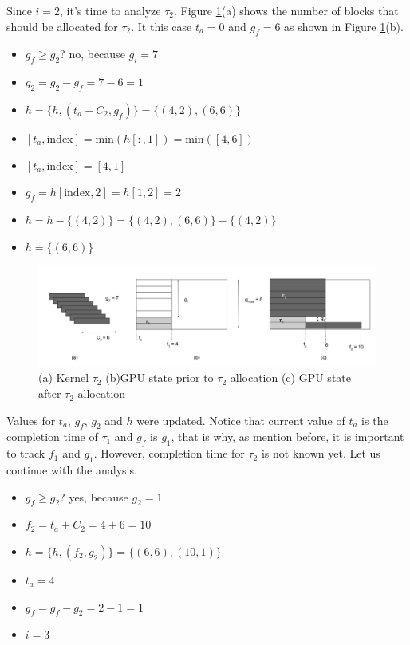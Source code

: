 \documentclass[
  12pt,
  a4paperpaper,
]{report}
\providecommand{\tightlist}{%
  \setlength{\itemsep}{0pt}\setlength{\parskip}{0pt}}
\begin{document}
Since \(i=2\), it's time to analyze \(\tau_2\). Figure \ref{img:ex_2}(a)
shows the number of blocks that should be allocated for \(\tau_2\). It
this case \(t_a = 0\) and \(g_f = 6\) as shown in Figure
\ref{img:ex_2}(b).

\begin{itemize}
\tightlist
\item
  \(g_f \geq g_2\)? no, because \(g_i = 7\)
\item
  \(g_2 = g_2 - g_f = 7-6 = 1\)
\item
  \(h = \{h, (t_a + C_2, g_f)\} = \{ (4,2), (6,6) \}\)
\item
  \([ t_a, \mathrm{index} ] = \mathrm{min}(h[:,1]) = \mathrm{min}([4,6])\)
\item
  \([ t_a, \mathrm{index} ] = [4,1]\)
\item
  \(g_f = h[ \mathrm{index},2] = h[1,2] = 2\)
\item
  \(h = h - \{ (4,2) \} = \{ (4,2), (6,6) \} - \{ (4,2) \}\)
\item
  \(h = \{(6,6)\}\)
\end{itemize}

\begin{figure}
\centering
\includegraphics{source/figures/ex_2.jpg}
\caption{(a) Kernel \(\tau_2\) (b)GPU state prior to \(\tau_2\)
allocation (c) GPU state after \(\tau_2\) allocation \label{img:ex_2}}
\end{figure}

Values for \(t_a\), \(g_f\), \(g_2\) and \(h\) were updated. Notice that
current value of \(t_a\) is the completion time of \(\tau_1\) and
\(g_f\) is \(g_1\), that is why, as mention before, it is important to
track \(f_1\) and \(g_1\). However, completion time for \(\tau_2\) is
not known yet. Let us continue with the analysis.

\begin{itemize}
\tightlist
\item
  \(g_f \geq g_2\)? yes, because \(g_2 = 1\)
\item
  \(f_2 = t_a + C_2 = 4 + 6 = 10\)
\item
  \(h = \{h, (f_2, g_2)\} = \{ (6,6),(10,1) \}\)
\item
  \(t_a = 4\)
\item
  \(g_f = g_f - g_2 = 2 - 1 = 1\)
\item
  \(i = 3\)
\end{itemize}
\end{document}

